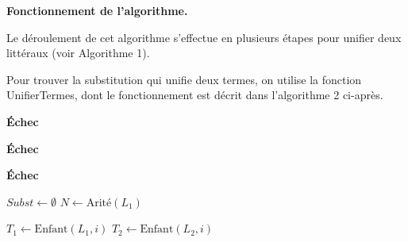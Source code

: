 \documentclass[11pt]{article}
\newenvironment{paraph}[1]{%
  \medskip
  \noindent\textbf{#1.}\quad

  \vspace{0.2cm}
}{%
  \medskip
}
\begin{document}
\begin{paraph}{Fonctionnement de l'algorithme}
    Le déroulement de cet algorithme s'effectue en plusieurs 
    étapes pour unifier deux littéraux (voir Algorithme 1).

    \vspace{0.2cm}
    Pour trouver la substitution qui unifie deux termes, on utilise 
    la fonction UnifierTermes, dont le fonctionnement est décrit dans l'algorithme 2 ci-après.
    \begin{algorithm}[H]
        \footnotesize
        \caption{Unification de deux littéraux (Robinson)}
        \label{alg:unification_robinson}
        \begin{algorithmic}[1] %
            
                
                \vspace{0.1cm}
                \State{}
                    \State\Return\textbf{Échec} 
                \EndIf

                \vspace{0.1cm}
                \State{}
                    \State\Return\textbf{Échec} 
                \EndIf
                
                \vspace{0.1cm}
                \State{}
                    \State\Return\textbf{Échec} 
                \EndIf
                
                \vspace{0.1cm}
                \State{}
                \State$Subst \gets \emptyset$ 
                \State$N \gets \text{Arité}(L_1)$
                
                    \State$T_1 \gets \text{Enfant}(L_1, i)$
                    \State$T_2 \gets \text{Enfant}(L_2, i)$
                    

\end{algorithmic}
\end{algorithm}
\end{paraph}
\end{document}
